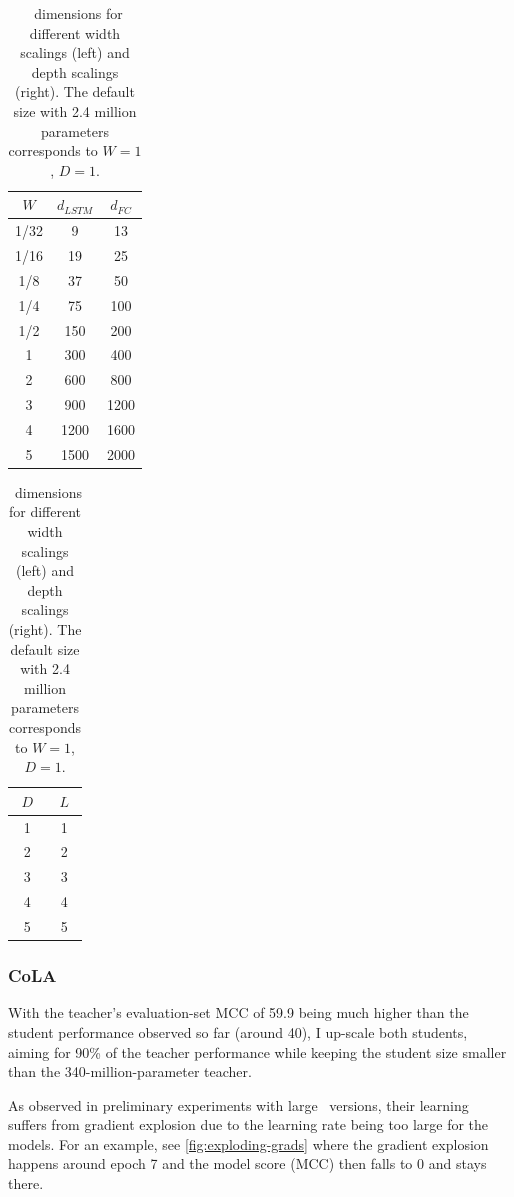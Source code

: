 {{    \begin{table}[h!t]
    \centering
    \begin{tabular}{c|cc}
    \hline
    $W$ & $d_{LSTM}$  & $d_{FC}$\\ 
    \hline
    1/32& 9           & 13 \\
    1/16& 19          & 25 \\
    1/8 & 37          & 50 \\
    1/4 & 75          & 100 \\
    1/2 & 150         & 200 \\
    1   & 300         & 400 \\
    2   & 600         & 800 \\
    3   & 900         & 1200 \\
    4   & 1200        & 1600 \\
    5   & 1500        & 2000 \\
    \hline
    \end{tabular}
    \quad \quad \quad \quad
    \begin{tabular}{c|c}
    \hline
    $D$ & $L$ \\
    \hline
    1   & 1  \\
    2   & 2  \\
    3   & 3  \\
    4   & 4  \\
    5   & 5  \\
    \hline
    \end{tabular}
    \caption{\LSTMS~dimensions for different width scalings (left) and depth scalings (right). The default size with 2.4 million parameters corresponds to $W=1$, $D=1$.}
    \label{tab:sizes-lstm}
    \end{table}

    \subsubsection{CoLA}{
      With the teacher's evaluation-set MCC of 59.9 being much higher than the student performance observed so far (around 40), I up-scale both students, aiming for 90\% of the teacher performance while keeping the student size smaller than the 340-million-parameter teacher.

      As observed in preliminary experiments with large \BERTS~versions, their learning suffers from gradient explosion due to the learning rate being too large for the models. For an example, see \autoref{fig:exploding-grads} where the gradient explosion happens around epoch 7 and the model score (MCC) then falls to 0 and stays there.

}}}

